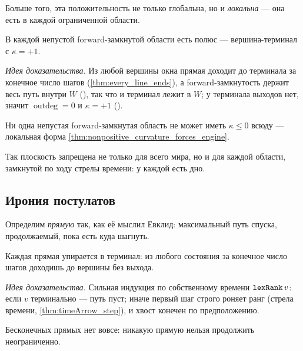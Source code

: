 Больше того, эта положительность не только глобальна, но и \emph{локальна} --- она есть в каждой
ограниченной области.

\begin{theorem}\label{thm:forwardClosed_has_pole}
\green{} В каждой непустой forward-замкнутой области есть полюс --- вершина-терминал с $\kappa = +1$.
\end{theorem}

\emph{Идея доказательства.} Из любой вершины окна прямая доходит до терминала за конечное число шагов
(\cref{thm:every_line_ends}), а forward-замкнутость держит весь путь внутри $W$
(), так что и терминал лежит в $W$; у терминала выходов нет, значит
$\operatorname{outdeg} = 0$ и $\kappa = +1$ ().

\begin{theorem}\label{thm:forwardClosed_not_flat}
\green{} Ни одна непустая forward-замкнутая область не может иметь $\kappa \le 0$ всюду --- локальная
форма \cref{thm:nonpositive_curvature_forces_engine}.
\end{theorem}

Так плоскость запрещена не только для всего мира, но и для каждой области, замкнутой по ходу стрелы
времени: у каждой есть дно.

\subsection{Ирония постулатов}

Определим \emph{прямую} так, как её мыслил Евклид: максимальный путь спуска, продолжаемый, пока есть
куда шагнуть.

\begin{theorem}\label{thm:every_line_ends}
\green{} Каждая прямая упирается в терминал: из любого состояния за конечное число шагов доходишь до
вершины без выхода.
\end{theorem}

\emph{Идея доказательства.} Сильная индукция по собственному времени $\texttt{lexRank}\,v$: если $v$
терминально --- путь пуст; иначе первый шаг строго роняет ранг (стрела времени,
\cref{thm:timeArrow_step}), и хвост конечен по предположению.

\begin{theorem}\label{thm:no_infinite_line}
\green{} Бесконечных прямых нет вовсе: никакую прямую нельзя продолжить неограниченно.
\end{theorem}

